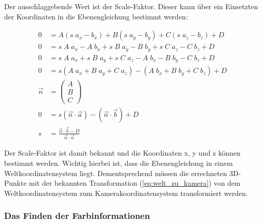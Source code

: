 	Der ausschlaggebende Wert ist der Scale-Faktor. Dieser kann über ein Einsetzten der Koordinaten in die Ebenengleichung bestimmt werden:
	
	\begin{equation}
		\begin{aligned}
			0 &= A(s \; a_x - b_x) + B(s \; a_y - b_y) + C(s \; a_z - b_z) + D \\
			0 &= s \; A \; a_x - A \; b_x + s \; B \; a_y - B \; b_y + s \; C \; a_z - C \; b_z + D \\
			0 &= s \; A \; a_x + s \; B \; a_y + s \; C \; a_z - A \; b_x - B \; b_y - C \; b_z + D \\
			0 &= s(A \; a_x + B \; a_y + C \; a_z) - (A \; b_x + B \; b_y + C \; b_z) + D \\
			\vec{n} &= \begin{pmatrix}
			A \\
			B \\
			C
			\end{pmatrix} \\
			0 &= s(\vec{n} \cdot \vec{a}) - (\vec{n} \cdot \vec{b}) + D \\
			s &= \frac{\vec{n} \cdot \vec{b} - D}{\vec{n} \cdot \vec{a}}
		\end{aligned}
	\end{equation}
	
	Der Scale-Faktor ist damit bekannt und die Koordinaten x, y und z können bestimmt werden. Wichtig hierbei ist, dass die Ebenengleichung in einem Weltkoordinatensystem liegt. Dementsprechend müssen die errechneten 3D-Punkte mit der bekannten Transformation (\ref{eq:welt_zu_kamera}) von dem Weltkoordinatensystem zum Kamerakoordinatensystem transformiert werden.
	
	\subsubsection{Das Finden der Farbinformationen}
	

